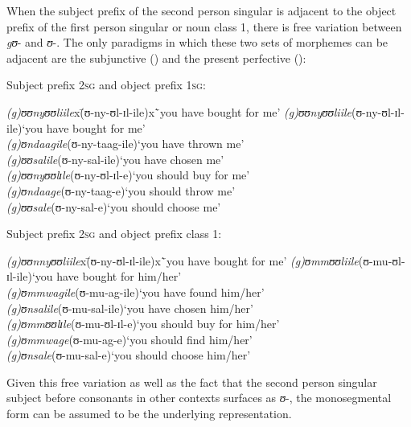 When the subject prefix of the second person singular is adjacent to the object prefix of the first person singular or noun class 1, there is free variation between \textit{gʊ}- and \textit{ʊ}-. The only paradigms in which these two sets of morphemes can be adjacent are the subjunctive () and the present perfective ():

\clearpage

\begin{exe}
	\ex \label{exSM2sgOM1SG}
	Subject prefix \textsc{2sg} and object prefix \textsc{1sg}:
	\begin{tabbing}
		\textit{(g)ʊʊnyʊʊliile}x\=(\degree ʊ-ny-ʊl-ɪl-ile)x\=`you have bought for me'\kill
		\textit{(g)ʊʊnyʊʊliile}\>(\degree ʊ-ny-ʊl-ɪl-ile)\>`you have bought for me'
		\\\textit{(g)ʊndaagile}\>(\degree ʊ-ny-taag-ile)\>`you have thrown me'
		\\\textit{(g)ʊʊsalile}\>(\degree ʊ-ny-sal-ile)\>`you have chosen me'
		\\\textit{(g)ʊʊnyʊʊlɪle}\>(\degree ʊ-ny-ʊl-ɪl-e)\>`you should buy for me'
		\\\textit{(g)ʊndaage}\>(\degree ʊ-ny-taag-e)\>`you should throw me'
		\\\textit{(g)ʊʊsale}\>(\degree ʊ-ny-sal-e)\>`you should choose me'
	\end{tabbing}
	\ex \label{exSM2sgOMNCL1} Subject prefix \textsc{2sg} and object prefix class 1:
	\begin{tabbing}
		\textit{(g)ʊʊnnyʊʊliile}x\=(\degree ʊ-ny-ʊl-ɪl-ile)x\=`you have bought for me'\kill
		\textit{(g)ʊmmʊʊliile}\>(\degree ʊ-mu-ʊl-ɪl-ile)\>`you have bought for him/her'
		\\\textit{(g)ʊmmwagile}\>(\degree ʊ-mu-ag-ile)\>`you have found him/her'
		\\\textit{(g)ʊnsalile}\>(\degree ʊ-mu-sal-ile)\>`you have chosen him/her'
		\\\textit{(g)ʊmmʊʊlɪle}\>(\degree ʊ-mu-ʊl-ɪl-e)\>`you should buy for him/her'
		\\\textit{(g)ʊmmwage}\>(\degree ʊ-mu-ag-e)\>`you should find him/her'
		\\\textit{(g)ʊnsale}\>(\degree ʊ-mu-sal-e)\>`you should choose him/her'
	\end{tabbing}
\end{exe}
Given this free variation as well as the fact that the second person singular subject before consonants in other contexts surfaces as \textit{ʊ}-, the monosegmental form can be assumed to be the underlying representation.
